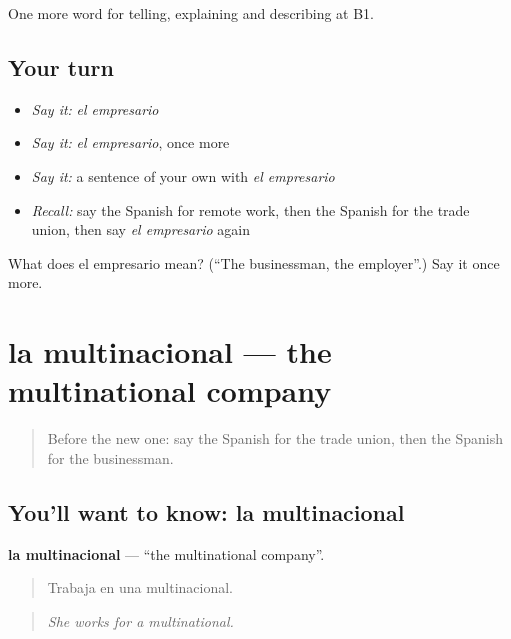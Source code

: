 \begin{grammarlens}[title={What you've built}]
One more word for telling, explaining and describing at B1.
\end{grammarlens}

\subsection*{Your turn}
\begin{itemize}
\raggedright
  \item \emph{Say it:} \emph{el empresario}
  \item \emph{Say it:} \emph{el empresario}, once more
  \item \emph{Say it:} a sentence of your own with \emph{el empresario}
  \item \emph{Recall:} say the Spanish for remote work, then the Spanish for the trade union, then say \emph{el empresario} again
\end{itemize}

\begin{tcolorbox}[breakable,colback=teal!4,colframe=teal!35!black,title={Before you move on}]
What does el empresario mean? (\textquotedblleft{}The businessman, the employer\textquotedblright{}.) Say it once more.
\end{tcolorbox}
\section[la multinacional]{la multinacional — the multinational company}

\label{lesson:ES-C592-multinacional}



\begin{quote}
Before the new one: say the Spanish for the trade union, then the Spanish for the businessman.
\end{quote}

\subsection*{You'll want to know: la multinacional}
\textbf{la multinacional} — \textquotedblleft{}the multinational company\textquotedblright{}.

\begin{quote}
Trabaja en una multinacional.
\end{quote}

\begin{quote}
\emph{She works for a multinational.}
\end{quote}

